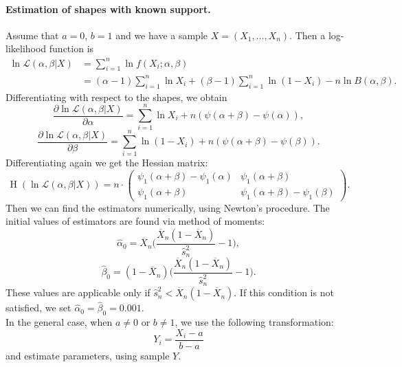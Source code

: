 \documentclass[a4paper,11pt]{article}
\theoremstyle{plain}
\theoremstyle{definition}
\begin{document}
	\paragraph{Estimation of shapes with known support.} Assume that $a=0$, $b=1$ and we have a sample $X = (X_1, \dots, X_n)$. Then a log-likelihood function is
	\begin{equation} \label{Beta log-likelihood}
	\begin{aligned}
	\ln \mathcal{L} (\alpha, \beta | X) &= \sum_{i=1}^{n} \ln f(X_i; \alpha, \beta) \\
	& = (\alpha - 1) \sum_{i=1}^{n} \ln X_i + (\beta - 1) \sum_{i=1}^{n}\ln (1-X_i) - n \ln B(\alpha, \beta).
	\end{aligned}  
	\end{equation}
	Differentiating with respect to the shapes, we obtain
	\[
	\frac{\partial \ln \mathcal{L}(\alpha, \beta | X)}{\partial \alpha} = \sum_{i=1}^{n} \ln X_i + n(\psi(\alpha + \beta) - \psi(\alpha)),
	 \]
	\[
	\frac{\partial \ln \mathcal{L}(\alpha, \beta | X)}{\partial \beta} = \sum_{i=1}^{n} \ln (1-X_i) + n(\psi(\alpha + \beta) - \psi(\beta)).
	\]
	Differentiating again we get the Hessian matrix:
	\[
	\operatorname{H}(\ln\mathcal{L}(\alpha,\beta|X)) = n \cdot \begin{pmatrix}
	\psi_1(\alpha+\beta)-\psi_1(\alpha) & \psi_1(\alpha+\beta) \\
	\psi_1(\alpha+\beta) & \psi_1(\alpha+\beta)-\psi_1(\beta)
	\end{pmatrix}.
	\]
	Then we can find the estimators numerically, using Newton's procedure. The initial values of estimators are found via method of moments:
	\[
	\hat{\alpha}_0 = \overline{X}_n \Bigg( \frac{\overline{X}_n(1-\overline{X}_n)}{\hat{s}_n^2} - 1 \Bigg),
	\]
	\[
	\hat{\beta}_0 = (1-\overline{X}_n) \Bigg( \frac{\overline{X}_n(1-\overline{X}_n)}{\hat{s}_n^2} - 1 \Bigg).
	\]
	These values are applicable only if $\hat{s}_n^2 < \overline{X}_n(1-\overline{X}_n)$. If this condition is not satisfied, we set $\hat{\alpha}_0 = \hat{\beta}_0 = 0.001$.\\
	In the general case, when $a \neq 0$ or $b \neq 1$, we use the following transformation:
	\[ Y_i = \frac{X_i - a}{b - a} \]
	and estimate parameters, using sample $Y$.
	
\end{document}
